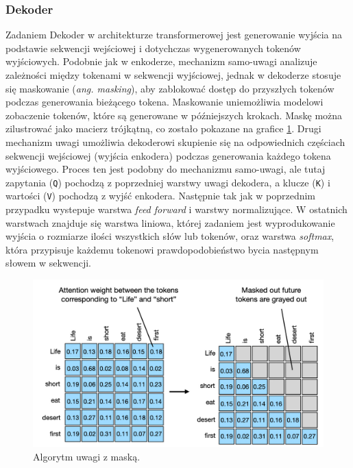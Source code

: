 \documentclass[data-science]{agh-wi} %
\begin{document}
\subsubsection*{Dekoder}
Zadaniem Dekoder w architekturze transformerowej jest generowanie wyjścia na podstawie sekwencji wejściowej i dotychczas wygenerowanych tokenów wyjściowych. Podobnie jak w enkoderze, mechanizm samo-uwagi analizuje zależności między tokenami w sekwencji wyjściowej, jednak w dekoderze stosuje się maskowanie (\textit{ang. masking}), aby zablokować dostęp do przyszłych tokenów podczas generowania bieżącego tokena. Maskowanie uniemożliwia modelowi zobaczenie tokenów, które są generowane w późniejszych krokach. Maskę można zilustrować jako macierz trójkątną, co zostało pokazane na grafice \ref*{fig:masked_attention}. Drugi mechanizm uwagi umożliwia dekoderowi skupienie się na odpowiednich częściach sekwencji wejściowej (wyjścia enkodera) podczas generowania każdego tokena wyjściowego. Proces ten jest podobny do mechanizmu samo-uwagi, ale tutaj zapytania (\texttt{Q}) pochodzą z poprzedniej warstwy uwagi dekodera, a klucze (\texttt{K}) i wartości (\texttt{V}) pochodzą z wyjść enkodera. Następnie tak jak w poprzednim przypadku wystepuje warstwa \textit{feed forward} i warstwy normalizujące. W ostatnich warstwach znajduje się warstwa liniowa, której zadaniem jest wyprodukowanie wyjścia o rozmiarze ilości wszystkich słów lub tokenów, oraz warstwa \textit{softmax}, która przypisuje każdemu tokenowi prawdopodobieństwo bycia następnym słowem w sekwencji.

\begin{figure}[ht!]
    \begin{center}
        \includegraphics[width=0.9\linewidth]{./img/masked_Att.jpg}
    \end{center}
    \caption{Algorytm uwagi z maską.}\label{fig:masked_attention}
\end{figure}
\end{document}
